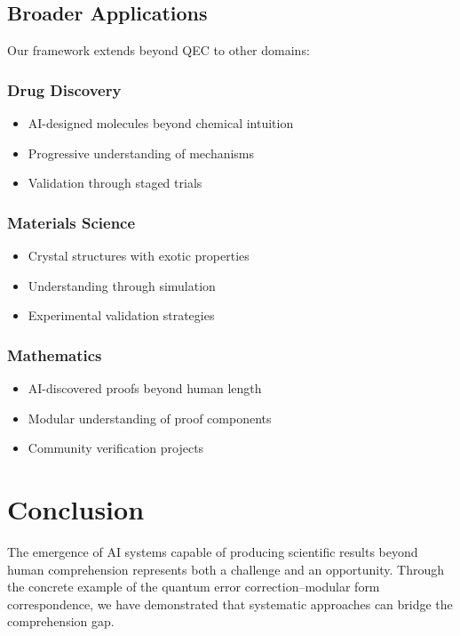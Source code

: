 \documentclass[11pt,a4paper]{article}
\begin{document}
\subsection{Broader Applications}

Our framework extends beyond QEC to other domains:

\subsubsection{Drug Discovery}
\begin{itemize}
\item AI-designed molecules beyond chemical intuition
\item Progressive understanding of mechanisms
\item Validation through staged trials
\end{itemize}

\subsubsection{Materials Science}
\begin{itemize}
\item Crystal structures with exotic properties
\item Understanding through simulation
\item Experimental validation strategies
\end{itemize}

\subsubsection{Mathematics}
\begin{itemize}
\item AI-discovered proofs beyond human length
\item Modular understanding of proof components
\item Community verification projects
\end{itemize}

\section{Conclusion}

The emergence of AI systems capable of producing scientific results beyond human comprehension represents both a challenge and an opportunity. Through the concrete example of the quantum error correction–modular form correspondence, we have demonstrated that systematic approaches can bridge the comprehension gap.
\end{document}
